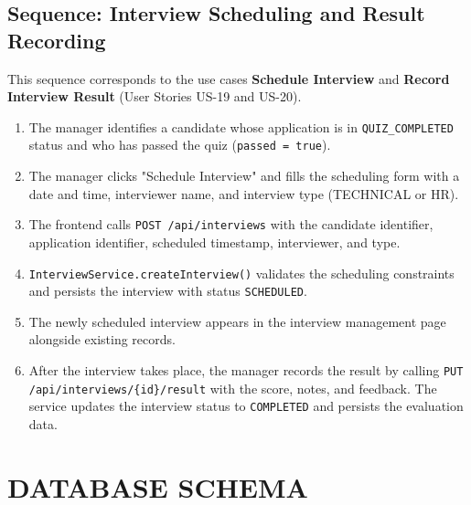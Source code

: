 \subsection{Sequence: Interview Scheduling and Result Recording}
This sequence corresponds to the use cases \textbf{Schedule Interview} and \textbf{Record Interview Result} (User Stories US-19 and US-20).

\begin{enumerate}
    \item The manager identifies a candidate whose application is in \texttt{QUIZ\_COMPLETED} status and who has passed the quiz (\texttt{passed = true}).
    \item The manager clicks "Schedule Interview" and fills the scheduling form with a date and time, interviewer name, and interview type (TECHNICAL or HR).
    \item The frontend calls \texttt{POST /api/interviews} with the candidate identifier, application identifier, scheduled timestamp, interviewer, and type.
    \item \texttt{InterviewService.createInterview()} validates the scheduling constraints and persists the interview with status \texttt{SCHEDULED}.
    \item The newly scheduled interview appears in the interview management page alongside existing records.
    \item After the interview takes place, the manager records the result by calling \texttt{PUT /api/interviews/\{id\}/result} with the score, notes, and feedback. The service updates the interview status to \texttt{COMPLETED} and persists the evaluation data.
\end{enumerate}

\section{DATABASE SCHEMA}

